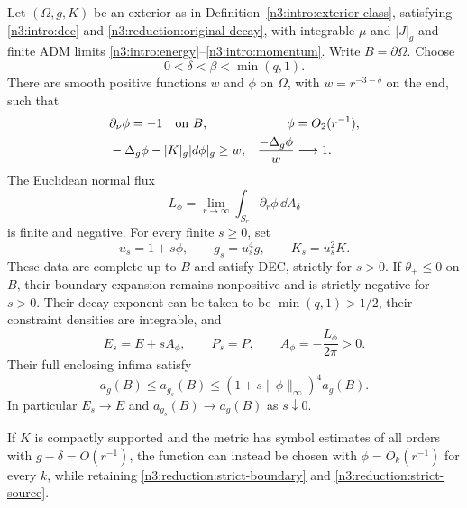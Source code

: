 \begin{lemma}
\label{n3:reduction:strict-direction}
Let $(\Omega,g,K)$ be an exterior as in
Definition~\ref{n3:intro:exterior-class}, satisfying
\eqref{n3:intro:dec} and \eqref{n3:reduction:original-decay}, with
integrable $\mu$ and $|J|_g$ and finite ADM limits
\eqref{n3:intro:energy}--\eqref{n3:intro:momentum}. Write
$B=\partial\Omega$. Choose
\[
 0<\delta<\beta<\min(q,1).
\]
There are smooth positive functions $w$ and $\phi$ on $\Omega$, with
$w=r^{-3-\delta}$ on the end, such that
\begin{align}
 &\partial_\nu\phi=-1\quad\hbox{on }B,
       &\phi&=O_2(r^{-1}),\label{n3:reduction:strict-boundary}\\
 &-\Delta_g\phi-|K|_g|d\phi|_g\ge w,
       &\frac{-\Delta_g\phi}{w}&\longrightarrow1.
       \label{n3:reduction:strict-source}
\end{align}
The Euclidean normal flux
\[
 L_\phi=\lim_{r\to\infty}
          \int_{S_r}\partial_r\phi\,\dd A_\delta
\]
is finite and negative.  For every finite $s\ge0$, set
\begin{equation}
 \label{n3:reduction:linear-family}
 u_s=1+s\phi,\qquad g_s=u_s^4g,\qquad K_s=u_s^2K.
\end{equation}
These data are complete up to $B$ and satisfy DEC, strictly for $s>0$.
If $\theta_+\le0$ on $B$, their boundary expansion remains nonpositive
and is strictly negative for $s>0$.  Their decay exponent can be taken to be
$\min(q,1)>1/2$, their constraint densities are integrable, and
\begin{equation}
 \label{n3:reduction:strict-charges}
 E_s=E+sA_\phi,\qquad P_s=P,
 \qquad A_\phi=-\frac{L_\phi}{2\pi}>0.
\end{equation}
Their full enclosing infima satisfy
\begin{equation}
 \label{n3:reduction:strict-areas}
 a_g(B)\le a_{g_s}(B)
       \le (1+s\|\phi\|_\infty)^4a_g(B).
\end{equation}
In particular $E_s\to E$ and $a_{g_s}(B)\to a_g(B)$ as $s\downarrow0$.

If $K$ is compactly supported and the metric has symbol estimates of all
orders with $g-\delta=O(r^{-1})$, the function can instead be chosen with
$\phi=O_k(r^{-1})$ for every $k$, while retaining
\eqref{n3:reduction:strict-boundary} and
\eqref{n3:reduction:strict-source}.
\end{lemma}

